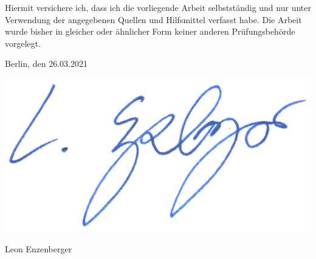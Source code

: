 
Hiermit versichere ich, dass ich die vorliegende Arbeit selbstständig und nur unter Verwendung der angegebenen Quellen und Hilfsmittel verfasst habe. Die Arbeit wurde bisher in gleicher oder ähnlicher Form keiner anderen Prüfungsbehörde vorgelegt.

\vskip 1cm

Berlin, den 26.03.2021

\includegraphics[height=5\baselineskip]{resources/own_content/Leon-Unterschrift}

Leon Enzenberger
